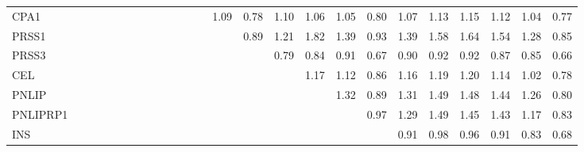 \begin{longtable}{lrrrrrrrrrrrrrrrrrrrrrrrr}
CPA1     &              &              &              &              &             &             &             &             &              &            &            &            &        1.09 &        0.78 &      1.10 &        1.06 &           1.05 &      0.80 &          1.07 &      1.13 &        1.15 &        1.12 &       1.04 &        0.77 \\
PRSS1    &              &              &              &              &             &             &             &             &              &            &            &            &             &        0.89 &      1.21 &        1.82 &           1.39 &      0.93 &          1.39 &      1.58 &        1.64 &        1.54 &       1.28 &        0.85 \\
PRSS3    &              &              &              &              &             &             &             &             &              &            &            &            &             &             &      0.79 &        0.84 &           0.91 &      0.67 &          0.90 &      0.92 &        0.92 &        0.87 &       0.85 &        0.66 \\
CEL      &              &              &              &              &             &             &             &             &              &            &            &            &             &             &           &        1.17 &           1.12 &      0.86 &          1.16 &      1.19 &        1.20 &        1.14 &       1.02 &        0.78 \\
PNLIP    &              &              &              &              &             &             &             &             &              &            &            &            &             &             &           &             &           1.32 &      0.89 &          1.31 &      1.49 &        1.48 &        1.44 &       1.26 &        0.80 \\
PNLIPRP1 &              &              &              &              &             &             &             &             &              &            &            &            &             &             &           &             &                &      0.97 &          1.29 &      1.49 &        1.45 &        1.43 &       1.17 &        0.83 \\
INS      &              &              &              &              &             &             &             &             &              &            &            &            &             &             &           &             &                &           &          0.91 &      0.98 &        0.96 &        0.91 &       0.83 &        0.68 \\

\end{longtable}
